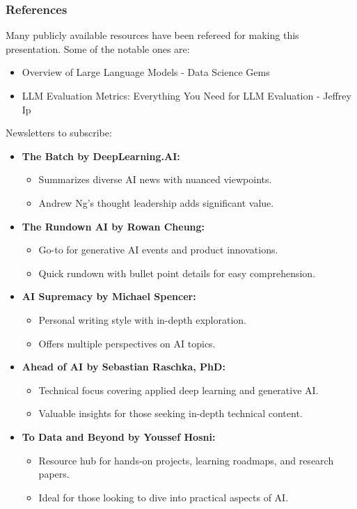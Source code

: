 \begin{frame}\frametitle{References}
Many publicly available resources have been refereed for making this presentation. Some of the notable ones are:
\footnotesize
\begin{itemize}
\item Overview of Large Language Models - Data Science Gems
\item LLM Evaluation Metrics: Everything You Need for LLM Evaluation - Jeffrey Ip
\end{itemize}

Newsletters to subscribe:

\begin{itemize}
  \item \textbf{The Batch by DeepLearning.AI:}
    \begin{itemize}
      \item Summarizes diverse AI news with nuanced viewpoints.
      \item Andrew Ng's thought leadership adds significant value.
    \end{itemize}

  \item \textbf{The Rundown AI by Rowan Cheung:}
    \begin{itemize}
      \item Go-to for generative AI events and product innovations.
      \item Quick rundown with bullet point details for easy comprehension.
    \end{itemize}

  \item \textbf{AI Supremacy by Michael Spencer:}
    \begin{itemize}
      \item Personal writing style with in-depth exploration.
      \item Offers multiple perspectives on AI topics.
    \end{itemize}

  \item \textbf{Ahead of AI by Sebastian Raschka, PhD:}
    \begin{itemize}
      \item Technical focus covering applied deep learning and generative AI.
      \item Valuable insights for those seeking in-depth technical content.
    \end{itemize}

  \item \textbf{To Data and Beyond by Youssef Hosni:}
    \begin{itemize}
      \item Resource hub for hands-on projects, learning roadmaps, and research papers.
      \item Ideal for those looking to dive into practical aspects of AI.
    \end{itemize}
\end{itemize}


\end{frame}
